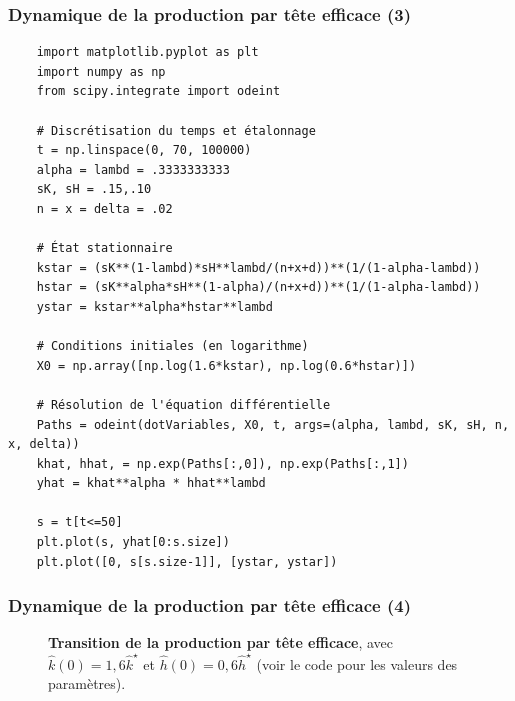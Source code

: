 \documentclass[10pt,notheorems]{beamer}
\theoremstyle{plain}
\theoremstyle{definition} %
\begin{document}
\begin{frame}[fragile]
  \frametitle{Dynamique de la production par tête efficace (3)}


  \begin{verbatim}
    import matplotlib.pyplot as plt
    import numpy as np
    from scipy.integrate import odeint

    # Discrétisation du temps et étalonnage
    t = np.linspace(0, 70, 100000)
    alpha = lambd = .3333333333
    sK, sH = .15,.10
    n = x = delta = .02

    # État stationnaire
    kstar = (sK**(1-lambd)*sH**lambd/(n+x+d))**(1/(1-alpha-lambd))
    hstar = (sK**alpha*sH**(1-alpha)/(n+x+d))**(1/(1-alpha-lambd))
    ystar = kstar**alpha*hstar**lambd

    # Conditions initiales (en logarithme)
    X0 = np.array([np.log(1.6*kstar), np.log(0.6*hstar)])

    # Résolution de l'équation différentielle
    Paths = odeint(dotVariables, X0, t, args=(alpha, lambd, sK, sH, n, x, delta))
    khat, hhat, = np.exp(Paths[:,0]), np.exp(Paths[:,1])
    yhat = khat**alpha * hhat**lambd

    s = t[t<=50]
    plt.plot(s, yhat[0:s.size])
    plt.plot([0, s[s.size-1]], [ystar, ystar])
  \end{verbatim}

\end{frame}


\begin{frame}[fragile]
  \frametitle{Dynamique de la production par tête efficace (4)}

  \bigskip

  \begin{figure}
    \caption{\textbf{Transition de  la production par tête efficace}, avec $\hat k(0)=1,6 \hat k^{\star}$ et $\hat h(0)=0,6 \hat h^{\star}$ (voir le code pour les valeurs des paramètres).}
  \end{figure}

\end{frame}
\end{document}
